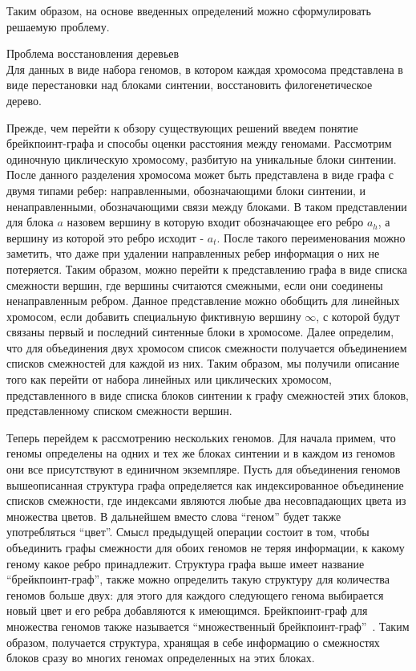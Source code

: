 Таким образом, на основе введенных определений можно сформулировать решаемую проблему.
\begin{prob}{Проблема восстановления деревьев} \\
  Для данных в виде набора геномов, в котором каждая хромосома представлена в виде перестановки над блоками синтении,
  восстановить филогенетическое дерево.
\end{prob}

Прежде, чем перейти к обзору существующих решений введем понятие брейкпоинт-графа и способы оценки расстояния между геномами.
Рассмотрим одиночную циклическую хромосому, разбитую на уникальные блоки синтении.
После данного разделения хромосома может быть представлена в виде графа с двумя типами ребер: направленными, обозначающими блоки синтении,
и ненаправленными, обозначающими связи между блоками.
В таком представлении для блока $a$ назовем вершину в которую входит обозначающее его ребро $a_h$, а вершину из которой это ребро исходит - $a_t$.
После такого переименования можно заметить, что даже при удалении направленных ребер информация о них не потеряется.
Таким образом, можно перейти к представлению графа в виде списка смежности вершин,
где вершины считаются смежными, если они соединены ненаправленным ребром.
Данное представление можно обобщить для линейных хромосом, если добавить специальную фиктивную вершину $\infty$, с которой будут связаны первый и последний синтенные блоки в хромосоме.
Далее определим, что для объединения двух хромосом список смежности получается объединением списков смежностей для каждой из них.
Таким образом, мы получили описание того как перейти от набора линейных или циклических хромосом, представленного
в виде списка блоков синтении к графу смежностей этих блоков, представленному списком смежности вершин.

Теперь перейдем к рассмотрению нескольких геномов.
Для начала примем, что геномы определены на одних и тех же блоках синтении и в каждом из геномов они все присутствуют в единичном экземпляре.
Пусть для объединения геномов вышеописанная структура графа определяется как индексированное объединение списков смежности,
где индексами являются любые два несовпадающих цвета из множества цветов.
В дальнейшем вместо слова ``геном'' будет также употребляться ``цвет''.
Смысл предыдущей операции состоит в том, чтобы объединить графы смежности для обоих геномов не теряя информации, к какому геному какое ребро принадлежит.
Структура графа выше имеет название ``брейкпоинт-граф'', также можно определить такую структуру для количества геномов больше двух:
для этого для каждого следующего генома выбирается новый цвет и его ребра добавляются к имеющимся.
Брейкпоинт-граф для множества геномов также называется ``множественный брейкпоинт-граф''~\cite{caprara1999tightness}.
Таким образом, получается структура, хранящая в себе информацию о смежностях блоков сразу во многих геномах определенных на этих блоках.

